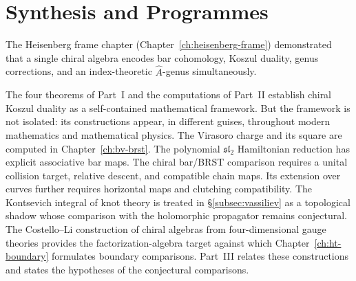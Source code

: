 \documentclass[11pt]{memoir}
\begin{document}


























\part{Synthesis and Programmes}

\noindent
The Heisenberg frame chapter (Chapter~\ref{ch:heisenberg-frame}) demonstrated
that a single chiral algebra encodes bar cohomology, Koszul duality, genus
corrections, and an index-theoretic $\hat{A}$-genus simultaneously.

The four theorems of Part~I and the computations of Part~II establish
chiral Koszul duality as a self-contained mathematical framework.  But the
framework is not isolated: its constructions appear, in different guises,
throughout modern mathematics and mathematical physics.  The Virasoro charge and its square are computed in
Chapter~\ref{ch:bv-brst}.
The polynomial $\mathfrak{sl}_2$ Hamiltonian reduction has explicit associative bar maps.
The chiral bar/BRST comparison requires a unital collision target, relative descent, and compatible chain maps.
Its extension over curves further requires horizontal maps and clutching compatibility.  The Kontsevich integral of knot theory is
treated in \S\ref{subsec:vassiliev} as a topological shadow whose
comparison with the holomorphic propagator remains conjectural.  The
Costello--Li construction of chiral algebras from four-dimensional
gauge theories provides the factorization-algebra target against which
Chapter~\ref{ch:ht-boundary} formulates boundary comparisons.  Part~III relates these constructions and states the hypotheses of the conjectural comparisons.
\end{document}

